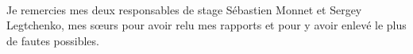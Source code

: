 \\
Je remercies mes deux responsables de stage Sébastien Monnet et Sergey Legtchenko, mes sœurs pour avoir relu mes rapports et pour y avoir enlevé le plus de fautes possibles. 
